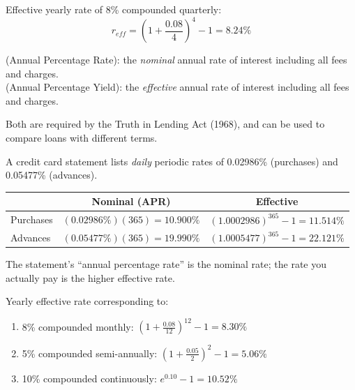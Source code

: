 \begin{example}
    Effective yearly rate of 8\% compounded quarterly:
    \[r_{eff} = \left(1+\frac{0.08}{4}\right)^4 - 1 = 8.24\%\]
\end{example}

\begin{definition}
     (Annual Percentage Rate): the \textit{nominal} annual rate of interest including all fees and charges.
    \\ (Annual Percentage Yield): the \textit{effective} annual rate of interest including all fees and charges.
\end{definition}
Both are required by the Truth in Lending Act (1968), and can be used to compare loans with different terms.

\begin{example}
    A credit card statement lists \textit{daily} periodic rates of 0.02986\% (purchases) and 0.05477\% (advances).
    \begin{center}
    \begin{tabular}{lcc}
        \toprule
        & Nominal (APR) & Effective\\
        \midrule
        Purchases & $(0.02986\%)(365) = 10.900\%$ & $(1.0002986)^{365} - 1 = 11.514\%$\\
        Advances & $(0.05477\%)(365) = 19.990\%$ & $(1.0005477)^{365} - 1 = 22.121\%$\\
        \bottomrule
    \end{tabular}
    \end{center}
    The statement's ``annual percentage rate'' is the nominal rate; the rate you actually pay is the higher effective rate.
\end{example}

\begin{example}
    Yearly effective rate corresponding to:
    \begin{enumerate}[label=(\alph*)]
        \item 8\% compounded monthly: $\left(1+\frac{0.08}{12}\right)^{12} - 1 = 8.30\%$
        \item 5\% compounded semi-annually: $\left(1+\frac{0.05}{2}\right)^{2} - 1 = 5.06\%$
        \item 10\% compounded continuously: $e^{0.10} - 1 = 10.52\%$
    \end{enumerate}
\end{example}

